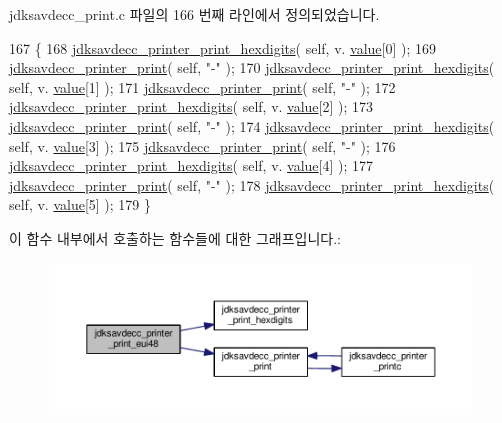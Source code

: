 jdksavdecc\+\_\+print.\+c 파일의 166 번째 라인에서 정의되었습니다.


\begin{DoxyCode}
167 \{
168     \hyperlink{group__util_ga6ee1e417ed3ee0efc12d4ed87e38c405}{jdksavdecc\_printer\_print\_hexdigits}( \textcolor{keyword}{self}, v.
      \hyperlink{structjdksavdecc__eui48_a18b93f04637cf37688ec10a33a0cbc26}{value}[0] );
169     \hyperlink{group__util_ga335ac75e0aa3fe66501b752bf9d0f90d}{jdksavdecc\_printer\_print}( \textcolor{keyword}{self}, \textcolor{stringliteral}{"-"} );
170     \hyperlink{group__util_ga6ee1e417ed3ee0efc12d4ed87e38c405}{jdksavdecc\_printer\_print\_hexdigits}( \textcolor{keyword}{self}, v.
      \hyperlink{structjdksavdecc__eui48_a18b93f04637cf37688ec10a33a0cbc26}{value}[1] );
171     \hyperlink{group__util_ga335ac75e0aa3fe66501b752bf9d0f90d}{jdksavdecc\_printer\_print}( \textcolor{keyword}{self}, \textcolor{stringliteral}{"-"} );
172     \hyperlink{group__util_ga6ee1e417ed3ee0efc12d4ed87e38c405}{jdksavdecc\_printer\_print\_hexdigits}( \textcolor{keyword}{self}, v.
      \hyperlink{structjdksavdecc__eui48_a18b93f04637cf37688ec10a33a0cbc26}{value}[2] );
173     \hyperlink{group__util_ga335ac75e0aa3fe66501b752bf9d0f90d}{jdksavdecc\_printer\_print}( \textcolor{keyword}{self}, \textcolor{stringliteral}{"-"} );
174     \hyperlink{group__util_ga6ee1e417ed3ee0efc12d4ed87e38c405}{jdksavdecc\_printer\_print\_hexdigits}( \textcolor{keyword}{self}, v.
      \hyperlink{structjdksavdecc__eui48_a18b93f04637cf37688ec10a33a0cbc26}{value}[3] );
175     \hyperlink{group__util_ga335ac75e0aa3fe66501b752bf9d0f90d}{jdksavdecc\_printer\_print}( \textcolor{keyword}{self}, \textcolor{stringliteral}{"-"} );
176     \hyperlink{group__util_ga6ee1e417ed3ee0efc12d4ed87e38c405}{jdksavdecc\_printer\_print\_hexdigits}( \textcolor{keyword}{self}, v.
      \hyperlink{structjdksavdecc__eui48_a18b93f04637cf37688ec10a33a0cbc26}{value}[4] );
177     \hyperlink{group__util_ga335ac75e0aa3fe66501b752bf9d0f90d}{jdksavdecc\_printer\_print}( \textcolor{keyword}{self}, \textcolor{stringliteral}{"-"} );
178     \hyperlink{group__util_ga6ee1e417ed3ee0efc12d4ed87e38c405}{jdksavdecc\_printer\_print\_hexdigits}( \textcolor{keyword}{self}, v.
      \hyperlink{structjdksavdecc__eui48_a18b93f04637cf37688ec10a33a0cbc26}{value}[5] );
179 \}
\end{DoxyCode}


이 함수 내부에서 호출하는 함수들에 대한 그래프입니다.\+:
\nopagebreak
\begin{figure}[H]
\begin{center}
\leavevmode
\includegraphics[width=350pt]{group__util_gacb8108c4a12e752331804ec34d89f9ab_cgraph}
\end{center}
\end{figure}




